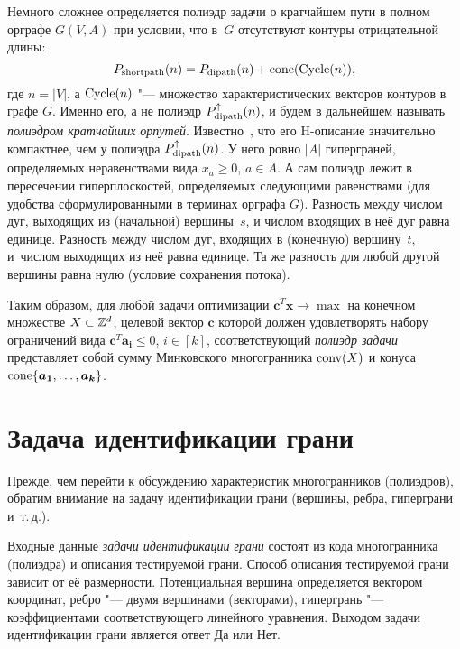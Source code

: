 Немного сложнее определяется полиэдр задачи о кратчайшем пути в полном орграфе $G(V,A)$ при условии, что в~$G$ отсутствуют контуры отрицательной длины:
\[
P_{\textup{shortpath}}(n) = P_{\textup{dipath}}(n) + \operatorname{cone}(\textup{Cycle}(n)),
\]
где $n = |V|$, а $\textup{Cycle}(n)$ "--- множество характеристических векторов контуров в графе $G$.
Именно его, а не полиэдр $P_{\textup{dipath}}^{\uparrow}(n)$, и будем в дальнейшем называть \emph{полиэдром кратчайших орпутей}.
Известно~\cite{Saigal:1969, Vohra:2011}, что его H-описание значительно компактнее, чем у полиэдра $P_{\textup{dipath}}^{\uparrow}(n)$.
У него ровно $|A|$ гиперграней, определяемых неравенствами вида $x_a \ge 0$, $a \in A$.
А сам полиэдр лежит в пересечении гиперплоскостей, определяемых следующими равенствами (для удобства сформулированными в терминах орграфа $G$).
Разность между числом дуг, выходящих из (начальной) вершины~$s$, и числом входящих в неё дуг равна единице.
Разность между числом дуг, входящих в (конечную) вершину~$t$, и~числом выходящих из неё равна единице.
Та же разность для любой другой вершины равна нулю (условие сохранения потока).

Таким образом, для любой задачи оптимизации $\bm{c}^T \bm{x} \to \max$ на конечном множестве $X\subset \mathbb{Z}^d$, целевой вектор $\bm{c}$ которой должен удовлетворять набору ограничений вида $\bm{c}^T \bm{a_i} \le 0$, $i \in [k]$, соответствующий \emph{полиэдр задачи} представляет собой сумму Минковского многогранника $\operatorname{conv}(X)$ и конуса %
$\operatorname{cone}\{\bm{a_1}, \dots, \bm{a_k}\}$.

%
%

\section{Задача идентификации грани}
\label{sec:Ident}

Прежде, чем перейти к обсуждению характеристик многогранников (полиэдров), обратим внимание на задачу идентификации грани (вершины, ребра, гиперграни и~т.\,д.). 

Входные данные \emph{задачи идентификации грани} состоят из кода многогранника (полиэдра) и описания тестируемой грани. 
Способ описания тестируемой грани зависит от её размерности.
Потенциальная вершина определяется вектором координат,
ребро "--- двумя вершинами (векторами), 
гипергрань "--- коэффициентами соответствующего линейного уравнения.
Выходом задачи идентификации грани является ответ Да или Нет.

